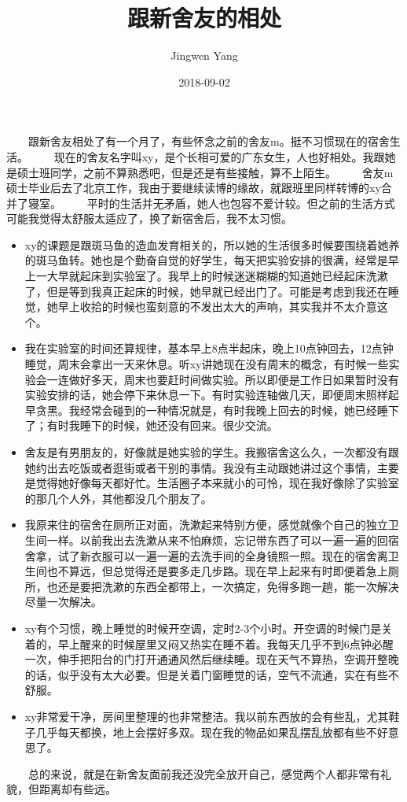 \documentclass[]{article}
\title{跟新舍友的相处}
\author{Jingwen Yang}
\date{2018-09-02}
\providecommand{\tightlist}{%
  \setlength{\itemsep}{0pt}\setlength{\parskip}{0pt}}
\begin{document}
\maketitle

  跟新舍友相处了有一个月了，有些怀念之前的舍友m。挺不习惯现在的宿舍生活。
  现在的舍友名字叫xy，是个长相可爱的广东女生，人也好相处。我跟她是硕士班同学，之前不算熟悉吧，但是还是有些接触，算不上陌生。
  舍友m硕士毕业后去了北京工作，我由于要继续读博的缘故，就跟班里同样转博的xy合并了寝室。
  平时的生活并无矛盾，她人也包容不爱计较。但之前的生活方式可能我觉得太舒服太适应了，换了新宿舍后，我不太习惯。

\begin{itemize}
\tightlist
\item
  xy的课题是跟斑马鱼的造血发育相关的，所以她的生活很多时候要围绕着她养的斑马鱼转。她也是个勤奋自觉的好学生，每天把实验安排的很满，经常是早上一大早就起床到实验室了。我早上的时候迷迷糊糊的知道她已经起床洗漱了，但是等到我真正起床的时候，她早就已经出门了。可能是考虑到我还在睡觉，她早上收拾的时候也蛮刻意的不发出太大的声响，其实我并不太介意这个。
\item
  我在实验室的时间还算规律，基本早上8点半起床，晚上10点钟回去，12点钟睡觉，周末会拿出一天来休息。听xy讲她现在没有周末的概念，有时候一些实验会一连做好多天，周末也要赶时间做实验。所以即便是工作日如果暂时没有实验安排的话，她会停下来休息一下。有时实验连轴做几天，即便周末照样起早贪黑。我经常会碰到的一种情况就是，有时我晚上回去的时候，她已经睡下了；有时我睡下的时候，她还没有回来。很少交流。
\item
  舍友是有男朋友的，好像就是她实验的学生。我搬宿舍这么久，一次都没有跟她约出去吃饭或者逛街或者干别的事情。我没有主动跟她讲过这个事情，主要是觉得她好像每天都好忙。生活圈子本来就小的可怜，现在我好像除了实验室的那几个人外，其他都没几个朋友了。
\item
  我原来住的宿舍在厕所正对面，洗漱起来特别方便，感觉就像个自己的独立卫生间一样。以前我出去洗漱从来不怕麻烦，忘记带东西了可以一遍一遍的回宿舍拿，试了新衣服可以一遍一遍的去洗手间的全身镜照一照。现在的宿舍离卫生间也不算远，但总觉得还是要多走几步路。现在早上起来有时即便着急上厕所，也还是要把洗漱的东西全都带上，一次搞定，免得多跑一趟，能一次解决尽量一次解决。
\item
  xy有个习惯，晚上睡觉的时候开空调，定时2-3个小时。开空调的时候门是关着的，早上醒来的时候屋里又闷又热实在睡不着。我每天几乎不到6点钟必醒一次，伸手把阳台的门打开通通风然后继续睡。现在天气不算热，空调开整晚的话，似乎没有太大必要。但是关着门窗睡觉的话，空气不流通，实在有些不舒服。
\item
  xy非常爱干净，房间里整理的也非常整洁。我以前东西放的会有些乱，尤其鞋子几乎每天都换，地上会摆好多双。现在我的物品如果乱摆乱放都有些不好意思了。
\end{itemize}

  总的来说，就是在新舍友面前我还没完全放开自己，感觉两个人都非常有礼貌，但距离却有些远。
\end{document}
